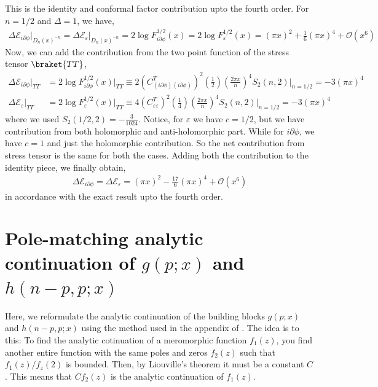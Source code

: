 \documentclass[11pt]{article}
\newcommand{\p}{\partial}
\newcommand{\mO}{\mathcal{O}}
\newcommand{\lb}{\left(}
\newcommand{\rb}{\right)}
\begin{document}
This is the identity and conformal factor contribution upto the fourth order. For $n=1/2$ and $\Delta = 1$, we have,
\begin{align}
    \Delta\mathcal{E}_{i\p\phi}\Big|_{D_n(x)^{-n}} = \Delta\mathcal{E}_{\varepsilon}\Big|_{D_n(x)^{-n}}=2\log F_{i\p\phi}^{1/2}(x) = 2\log F_{\varepsilon}^{1/2}(x) =(\pi x)^2 + \frac{1}{6}(\pi x)^4 + \mO(x^6)
\end{align}
Now, we can add the contribution from the two point function of the stress tensor $\braket{TT}$,
\begin{align}
     \Delta \mathcal{E}_{i\p\phi}\Big|_{TT }&=2\log F_{i\p\phi}^{1/2}(x)\Big|_{TT }\equiv 2\lb C^T_{(i\p\phi)(i\p\phi)}\rb^2 \lb\frac{1}{2}\rb \lb\frac{2\pi x}{n}\rb^4 S_2(n,2)\Bigg|_{n=1/2} = -3(\pi x)^4 \\
     \Delta \mathcal{E}_{\varepsilon}\Big|_{TT }&=2\log F_{\varepsilon}^{1/2}(x)\Big|_{TT }\equiv 4\lb C^T_{\varepsilon\varepsilon}\rb^2 \lb\frac{1}{4}\rb\lb\frac{2\pi x}{n}\rb^4 S_2(n,2)\Bigg|_{n=1/2} = -3(\pi x)^4 
\end{align}
where we used $S_2(1/2,2) = -\frac{3}{1024}$.
Notice, for $\varepsilon$ we have $c = 1/2$, but we have contribution from both holomorphic and anti-holomorphic part. While for $i\p\phi$, we have $c=1$ and just the holomorphic contribution. So the net contribution from stress tensor is the same for both the cases.
Adding both the contribution to the identity piece, we finally obtain,
\begin{align}
    \Delta\mathcal{E}_{i\p\phi} = \Delta\mathcal{E}_{\varepsilon}=(\pi x)^2 -\frac{17}{6}(\pi x)^4 +\mO(x^6)
\end{align}
in accordance with the exact result upto the fourth order. 

\section{\texorpdfstring{Pole-matching analytic continuation of $g(p;x)$ and $h(n-p,p;x)$}
{Pole-matching analytic continuation of g(p;x) and h(n-p,p;x)}}


  Here, we reformulate the analytic continuation of the building blocks $g(p;x)$
  and $h(n-p,p;x)$ using the method used in the appendix of 
  \cite{Lashkari_2016}.
  The idea is to this: To find the analytic cotinuation of a meromorphic function
  $f_{1}(z)$, you find another entire function with the same poles and zeros
  $f_{2}(z)$ such that $f_{1}(z)/f_{z}(2)$ is bounded. Then, by Liouville's
  theorem it must be a constant $C$. This means that $C f_{2}(z)$ is the analytic
  continuation of $f_{1}(z)$.
\end{document}
